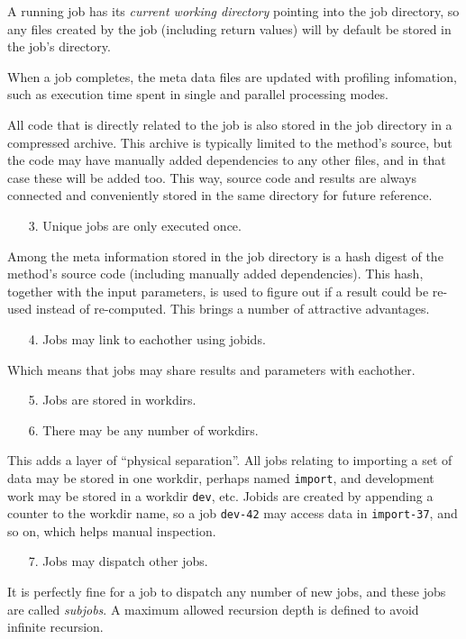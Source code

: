 A running job has its \textsl{current working directory} pointing into
the job directory, so any files created by the job (including return
values) will by default be stored in the job's directory.

When a job completes, the meta data files are updated with profiling
infomation, such as execution time spent in single and parallel
processing modes.

All code that is directly related to the job is also stored in the job
directory in a compressed archive.  This archive is typically limited
to the method's source, but the code may have manually added
dependencies to any other files, and in that case these will be added
too.  This way, source code and results are always connected and
conveniently stored in the same directory for future reference.
\begin{itemize}
\item[3.]  Unique jobs are only executed once.
\end{itemize}
Among the meta information stored in the job directory is a hash
digest of the method's source code (including manually added
dependencies).  This hash, together with the input parameters, is used
to figure out if a result could be re-used instead of re-computed.
This brings a number of attractive advantages.
\begin{itemize}
\item[4.]  Jobs may link to eachother using jobids.
\end{itemize}
Which means that jobs may share results and parameters with eachother.
\begin{itemize}
\item[5.]  Jobs are stored in workdirs.
\item[6.]  There may be any number of workdirs.
\end{itemize}
This adds a layer of ``physical separation''.  All jobs relating to
importing a set of data may be stored in one workdir, perhaps named
\texttt{import}, and development work may be stored in a workdir
\texttt{dev}, etc.  Jobids are created by appending a counter to the
workdir name, so a job \texttt{dev-42} may access data in
\texttt{import-37}, and so on, which helps manual inspection.
\begin{itemize}
\item[7.] Jobs may dispatch other jobs.
\end{itemize}
It is perfectly fine for a job to dispatch any number of new jobs, and
these jobs are called \textsl{subjobs}.  A maximum allowed recursion
depth is defined to avoid infinite recursion.




